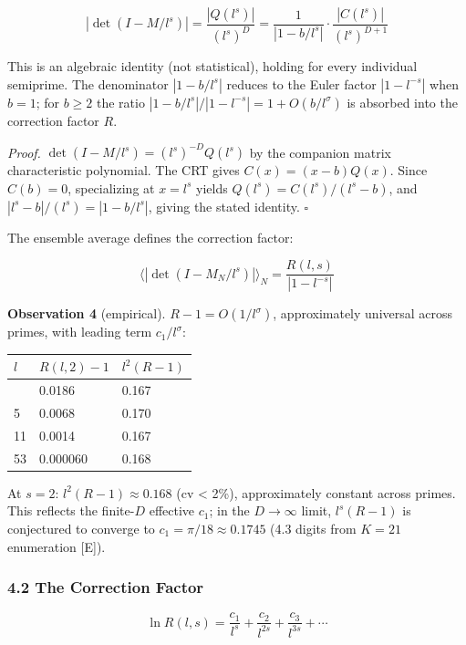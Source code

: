 \documentclass[
  11pt,
]{article}
\begin{document}
\[|\det(I - M/l^s)| = \frac{|Q(l^s)|}{(l^s)^D} = \frac{1}{|1 - b/l^s|} \cdot \frac{|C(l^s)|}{(l^s)^{D+1}}\]

This is an algebraic identity (not statistical), holding for every individual
semiprime. The denominator \(|1 - b/l^s|\) reduces to the Euler factor
\(|1 - l^{-s}|\) when \(b = 1\); for \(b \geq 2\) the ratio
\(|1 - b/l^s|/|1 - l^{-s}| = 1 + O(b/l^{\sigma})\) is absorbed into the
correction factor \(R\).

\emph{Proof.} \(\det(I - M/l^s) = (l^s)^{-D}Q(l^s)\) by the companion matrix
characteristic polynomial. The CRT gives \(C(x) = (x-b)Q(x)\). Since
\(C(b) = 0\), specializing at \(x = l^s\) yields \(Q(l^s) = C(l^s)/(l^s - b)\),
and \(|l^s - b|/(l^s) = |1 - b/l^s|\), giving the stated identity. \(\square\)

The ensemble average defines the correction factor:

\[\langle|\det(I - M_N/l^s)|\rangle_N = \frac{R(l,s)}{|1 - l^{-s}|}\]

\textbf{Observation 4} (empirical). \(R - 1 = O(1/l^{\sigma})\), approximately
universal across primes, with leading term \(c_1/l^{\sigma}\):

\begin{longtable}[]{@{}lll@{}}
\toprule\noalign{}
\(l\) & \(R(l,2) - 1\) & \(l^2(R-1)\) \\
\midrule\noalign{}
\endhead
\bottomrule\noalign{}
\endlastfoot
3 & 0.0186 & 0.167 \\
5 & 0.0068 & 0.170 \\
11 & 0.0014 & 0.167 \\
53 & 0.000060 & 0.168 \\
\end{longtable}

At \(s = 2\): \(l^2(R-1) \approx 0.168\) (cv \textless{} 2\%), approximately
constant across primes. This reflects the finite-\(D\) effective \(c_1\); in the
\(D \to \infty\) limit, \(l^s(R-1)\) is conjectured to converge to
\(c_1 = \pi/18 \approx 0.1745\) (4.3 digits from \(K = 21\) enumeration
{[}E{]}).

\subsubsection{4.2 The Correction Factor}\label{the-correction-factor}

\[\ln R(l,s) = \frac{c_1}{l^s} + \frac{c_2}{l^{2s}} + \frac{c_3}{l^{3s}} + \cdots\]
\end{document}
